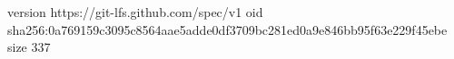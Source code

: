 version https://git-lfs.github.com/spec/v1
oid sha256:0a769159c3095c8564aae5adde0df3709bc281ed0a9e846bb95f63e229f45ebe
size 337
